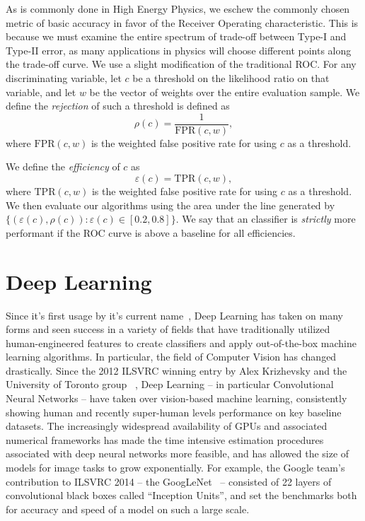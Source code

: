 \documentclass{article}
\begin{document}
As is commonly done in High Energy Physics, we eschew the commonly chosen metric of basic accuracy in favor of the Receiver Operating characteristic. This is because we must examine the entire spectrum of trade-off between Type-I and Type-II error, as many applications in physics will choose different points along the trade-off curve. We use a slight modification of the traditional ROC. For any discriminating variable, let $c$ be a threshold on the likelihood ratio on that variable, and let $w$ be the vector of weights over the entire evaluation sample. We define the \emph{rejection} of such a threshold is defined as 
$$
    \rho(c) = \frac{1}{\text{FPR}(c, w)},
$$
where $\text{FPR}(c, w)$ is the weighted false positive rate for using $c$ as a threshold.

We define the \emph{efficiency} of $c$ as 
$$
    \varepsilon(c) = \text{TPR}(c, w),
$$
where $\text{TPR}(c, w)$ is the weighted false positive rate for using $c$ as a threshold. We then evaluate our algorithms using the area under the line generated by $\{(\varepsilon(c), \rho(c)) : \varepsilon(c)\in [0.2, 0.8]\}$. We say that an classifier is \emph{strictly} more performant if the ROC curve is above a baseline for all efficiencies.



\section{Deep Learning}

Since it's first usage by it's current name~\cite{hinton06}, Deep Learning has taken on many forms and seen success in a variety of fields that have traditionally utilized human-engineered features to create classifiers and apply out-of-the-box machine learning algorithms. In particular, the field of Computer Vision has changed drastically. Since the 2012 ILSVRC winning entry by Alex Krizhevsky and the University of Toronto group ~\cite{alexnet}, Deep Learning -- in particular Convolutional Neural Networks -- have taken over vision-based machine learning, consistently showing human and recently super-human levels performance on key baseline datasets. The increasingly widespread availability of GPUs and associated numerical frameworks has made the time intensive estimation procedures associated with deep neural networks more feasible, and has allowed the size of models for image tasks to grow exponentially. For example, the Google team's contribution to ILSVRC 2014 -- the GoogLeNet~\cite{googlenet} -- consisted of 22 layers of convolutional black boxes called ``Inception Units'', and set the benchmarks both for accuracy and speed of a model on such a large scale. 
\end{document}
